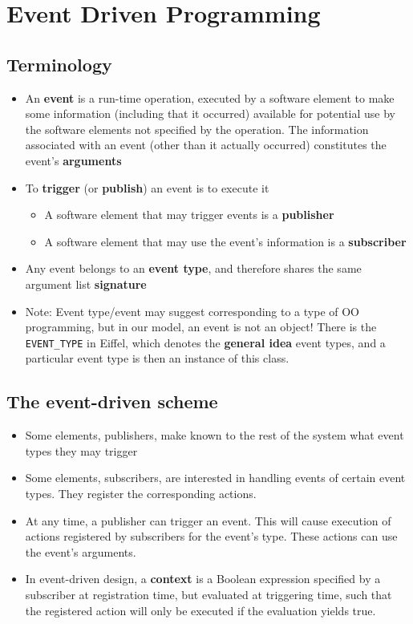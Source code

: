 \documentclass[a4paper]{article}
\newcommand{\inline}[1]{\lstinline!#1!}%
\begin{document}
\section{Event Driven Programming}
\subsection{Terminology}
\begin{itemize}
\item An \textbf{event} is a run-time operation, executed by a software element to make some information (including that it occurred) available for potential use by the software elements not specified by the operation. The information associated with an event (other than it actually occurred) constitutes the event's \textbf{arguments}
\item To \textbf{trigger} (or \textbf{publish}) an event is to execute it
\begin{itemize}
\item A software element that may trigger events is a \textbf{publisher}
\item A software element that may use the event's information is a \textbf{subscriber}
\end{itemize}
\item Any event belongs to an \textbf{event type}, and therefore shares the same argument list \textbf{signature}
\item Note: Event type/event may suggest corresponding to a type of OO programming, but in our model, an event is not an object! There is the \inline{EVENT_TYPE} in Eiffel, which denotes the \textbf{general idea} event types, and a particular event type is then an instance of this class.
\end{itemize}
\subsection{The event-driven scheme}
\begin{itemize}
\item Some elements, publishers, make known to the rest of the system what event types they may trigger
\item Some elements, subscribers, are interested in handling events of certain event types. They register the corresponding actions.
\item At any time, a publisher can trigger an event. This will cause execution of actions registered by subscribers for the event's type. These actions can use the event's arguments. 
\item In event-driven design, a \textbf{context} is a Boolean expression specified by  a subscriber at registration time, but evaluated at triggering time, such that the registered action will only be executed if the evaluation yields true. 
\end{itemize}
\end{document}
